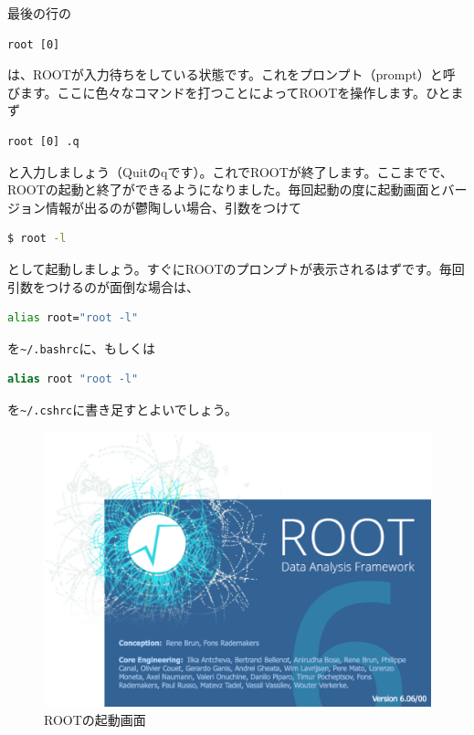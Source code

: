最後の行の
\begin{lstlisting}
root [0]
\end{lstlisting}
は、ROOTが入力待ちをしている状態です。これをプロンプト（prompt）と呼びます。ここに色々なコマンドを打つことによってROOTを操作します。ひとまず
\begin{lstlisting}
root [0] .q
\end{lstlisting}
と入力しましょう（Quitのqです）。これでROOTが終了します。ここまでで、ROOTの起動と終了ができるようになりました。毎回起動の度に起動画面とバージョン情報が出るのが鬱陶しい場合、引数をつけて
\begin{lstlisting}[language=bash]
$ root -l
\end{lstlisting}
として起動しましょう。すぐにROOTのプロンプトが表示されるはずです。毎回引数をつけるのが面倒な場合は、
\begin{lstlisting}[language=bash]
alias root="root -l"
\end{lstlisting}
を\texttt{\~{}/.bashrc}に、もしくは
\begin{lstlisting}[language=csh]
alias root "root -l"
\end{lstlisting}
を\texttt{\~{}/.cshrc}に書き足すとよいでしょう。

\begin{figure}
  \centering
  \includegraphics[width=12cm]{fig/splash6.png}
  \caption{ROOTの起動画面}
  \label{fig_splash}
\end{figure}

